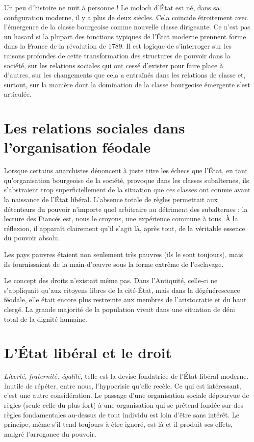 Un peu d'histoire ne nuit à personne ! Le moloch d'État est né, dans sa configuration moderne, il y a plus de deux siècles. Cela coïncide étroitement avec l'émergence de la classe bourgeoise comme nouvelle classe dirigeante. Ce n'est pas un hasard si la plupart des fonctions typiques de l'État moderne prennent forme dans la France de la révolution de 1789. Il est logique de s'interroger sur les raisons profondes de cette transformation des structures de pouvoir dans la société, sur les relations sociales qui ont cessé d'exister pour faire place à d'autres, sur les changements que cela a entraînés dans les relations de classe et, surtout, sur la manière dont la domination de la classe bourgeoise émergente s'est articulée.

\section{Les relations sociales dans l'organisation féodale}

Lorsque certains anarchistes dénoncent à juste titre les échecs que l'État, en tant qu'organisation bourgeoise de la société, provoque dans les classes subalternes, ils s'abstraient trop superficiellement de la situation que ces classes ont connue avant la naissance de l'État libéral. L'absence totale de règles permettait aux détenteurs du pouvoir n'importe quel arbitraire au détriment des subalternes : la lecture des Fiancés est, nous le croyons, une expérience commune à tous. À la réflexion, il apparaît clairement qu'il s'agit là, après tout, de la véritable essence du pouvoir absolu.

Les pays pauvres étaient non seulement très pauvres (ils le sont toujours), mais ils fournissaient de la main-d'œuvre sous la forme extrême de l'esclavage.

Le concept des droits n'existait même pas. Dans l'Antiquité, celle-ci ne s'appliquait qu'aux citoyens libres de la cité-État, mais dans la dégénérescence féodale, elle était encore plus restreinte aux membres de l'aristocratie et du haut clergé. La grande majorité de la population vivait dans une situation de déni total de la dignité humaine.

\section{L'État libéral et le droit}

\emph{Liberté, fraternité, égalité,} telle est la devise fondatrice de l'État libéral moderne. Inutile de répéter, entre nous, l'hypocrisie qu'elle recèle. Ce qui est intéressant, c'est une autre considération. Le passage d'une organisation sociale dépourvue de règles (seule celle du plus fort) à une organisation qui se prétend fondée sur des règles fondamentales au-dessus de tout individu est loin d'être sans intérêt. Le principe, même s'il tend toujours à être ignoré, est là et il produit ses effets, malgré l'arrogance du pouvoir.

